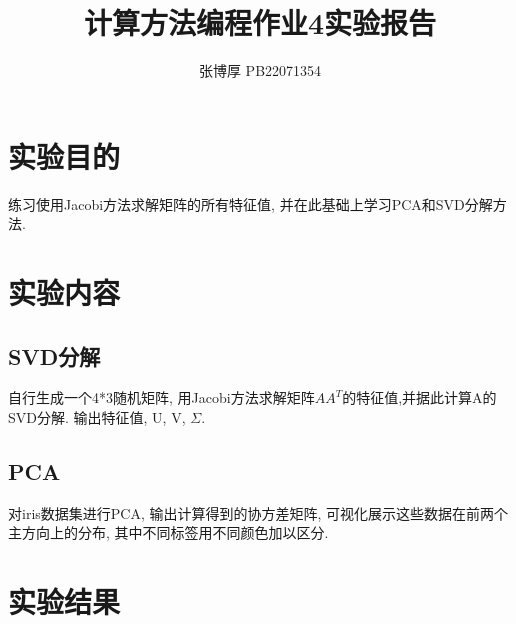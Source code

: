 \documentclass[12pt,a4paper,oneside]{article}
\title{计算方法编程作业4实验报告}
\author{张博厚 PB22071354}
\date{}
\begin{document}
\maketitle

\section{实验目的}
练习使用Jacobi方法求解矩阵的所有特征值, 并在此基础上学习PCA和SVD分解方法.

\section{实验内容}
\subsection{SVD分解}
自行生成一个4*3随机矩阵, 用Jacobi方法求解矩阵$AA^T$的特征值,并据此计算A的SVD分解.
输出特征值, U, V, $\Sigma$.
\subsection{PCA}
对iris数据集进行PCA, 输出计算得到的协方差矩阵,
可视化展示这些数据在前两个主方向上的分布, 其中不同标签用不同颜色加以区分.

\section{实验结果}
\end{document}
